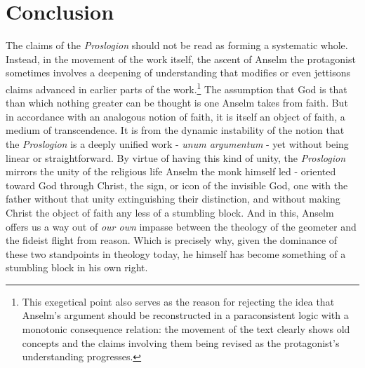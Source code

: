 \documentclass[]{birkjour}
\begin{document}
\section{Conclusion}
The claims of the \textit{Proslogion} should not be read as forming a systematic whole. Instead, in the movement of the work itself, the ascent of Anselm the protagonist sometimes involves a deepening of understanding that modifies or even jettisons claims advanced in earlier parts of the work.\footnote{This exegetical point also serves as the reason for rejecting the idea that Anselm's argument should be reconstructed in a paraconsistent logic with a monotonic consequence relation: the movement of the text clearly shows old concepts and the claims involving them being revised as the protagonist's understanding progresses.} The assumption that God is that than which nothing greater can be thought is one Anselm takes from faith. But in accordance with an analogous notion of faith, it is itself an object of faith, a medium of transcendence. It is from the dynamic instability of the notion that the \textit{Proslogion} is a deeply unified work - \textit{unum argumentum} - yet without being linear or straightforward. By virtue of having this kind of unity, the \textit{Proslogion} mirrors the unity of the religious life Anselm the monk himself led - oriented toward God through Christ, the sign, or icon of the invisible God, one with the father without that unity extinguishing their distinction, and without making Christ the object of faith any less of a stumbling block. And in this, Anselm offers us a way out of \textit{our own} impasse between the theology of the geometer and the fideist flight from reason. Which is precisely why, given the dominance of these two standpoints in theology today, he himself has become something of a stumbling block in his own right.

\nocite{AlexanderST}
\nocite{RichardDT}
\nocite{Anselm1968}
\nocite{Meditations}
\nocite{CrispinDisp}



\end{document}
